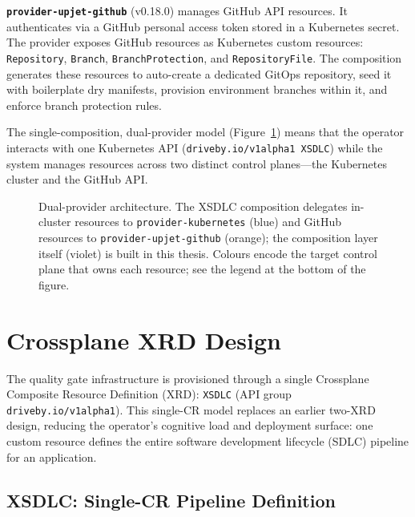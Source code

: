 \textbf{\texttt{provider-upjet-github}} (v0.18.0) manages GitHub API resources. It authenticates via a GitHub personal access token stored in a Kubernetes secret. The provider exposes GitHub resources as Kubernetes custom resources: \texttt{Repository}, \texttt{Branch}, \texttt{BranchProtection}, and \texttt{RepositoryFile}. The composition generates these resources to auto-create a dedicated GitOps repository, seed it with boilerplate dry manifests, provision environment branches within it, and enforce branch protection rules.

The single-composition, dual-provider model (Figure~\ref{fig:provider-architecture}) means that the operator interacts with one Kubernetes API (\texttt{driveby.io/v1alpha1 XSDLC}) while the system manages resources across two distinct control planes---the Kubernetes cluster and the GitHub API.

\begin{figure}[htbp]
\centering
\resizebox{0.85\textwidth}{!}{%
%
}
\caption{Dual-provider architecture. The XSDLC composition delegates in-cluster resources to \texttt{provider-kubernetes} (blue) and GitHub resources to \texttt{provider-upjet-github} (orange); the composition layer itself (violet) is built in this thesis. Colours encode the target control plane that owns each resource; see the legend at the bottom of the figure.}
\label{fig:provider-architecture}
\end{figure}

\section{Crossplane XRD Design}
\label{sec:xrd-design}

The quality gate infrastructure is provisioned through a single Crossplane Composite Resource Definition (XRD): \texttt{XSDLC} (API group \texttt{driveby.io/v1alpha1}). This single-CR model replaces an earlier two-XRD design, reducing the operator's cognitive load and deployment surface: one custom resource defines the entire software development lifecycle (SDLC) pipeline for an application.

\subsection{XSDLC: Single-CR Pipeline Definition}
\label{subsec:xrd-xsdlc}

